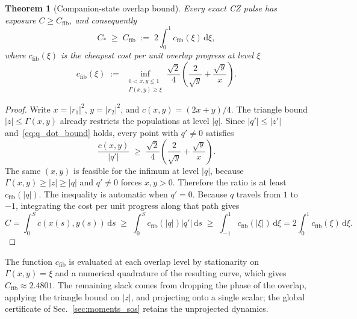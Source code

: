\documentclass[aps,prx,reprint,nofootinbib,longbibliography,floatfix]{revtex4-2}
\newtheorem{theorem}{Theorem}
\theoremstyle{plain}
\theoremstyle{remark}
\newcommand{\dd}{\mathrm{d}}
\begin{document}
\begin{theorem}[Companion-state overlap bound]
\label{thm:fiber}
Every exact CZ pulse has exposure $C\ge C_{\mathrm{fib}}$, and consequently
\begin{equation}
C_* \;\ge\; C_{\mathrm{fib}} \;:=\; 2\int_0^1 c_{\mathrm{fib}}(\xi)\,\dd\xi,
\label{eq:C_fib}
\end{equation}
where $c_{\mathrm{fib}}(\xi)$ is the cheapest cost per unit overlap progress at level $\xi$
\begin{equation}
c_{\mathrm{fib}}(\xi) \;:=\; \inf_{\substack{0 < x, y \le 1 \\ \Gamma(x,y) \ge \xi}} \frac{\sqrt{2}}{4}\left( \frac{2}{\sqrt{y}} + \frac{\sqrt{y}}{x} \right).
\label{eq:c_fib_def}
\end{equation}
\end{theorem}
\begin{proof}
Write $x=|r_1|^2$, $y=|r_2|^2$, and $c(x,y)=(2x+y)/4$. The triangle bound $|z|\le\Gamma(x,y)$ already restricts the populations at level $|q|$.
Since $|q'|\le|z'|$ and~\eqref{eq:q_dot_bound} holds, every point with $q'\ne0$ satisfies
\begin{equation}
\frac{c(x,y)}{|q'|}
\;\ge\; \frac{\sqrt{2}}{4}\left(\frac{2}{\sqrt{y}}+\frac{\sqrt{y}}{x}\right).
\label{eq:fiber_pointwise}
\end{equation}
The same $(x,y)$ is feasible for the infimum at level $|q|$, because $\Gamma(x,y)\ge|z|\ge|q|$ and $q'\ne0$ forces $x,y>0$. Therefore the ratio is at least $c_{\mathrm{fib}}(|q|)$.
The inequality is automatic when $q'=0$. Because $q$ travels from $1$ to $-1$, integrating the cost per unit progress along that path gives
\begin{equation}
C=\int_0^S c(x(s),y(s))\,\dd s
\;\ge\;\int_0^S c_{\mathrm{fib}}(|q|)|q'|\,\dd s
\;\ge\;\int_{-1}^{1}c_{\mathrm{fib}}(|\xi|)\,\dd\xi
=2\int_0^1c_{\mathrm{fib}}(\xi)\,\dd\xi.
\end{equation}
\end{proof}

The function $c_{\mathrm{fib}}$ is evaluated at each overlap level by stationarity on $\Gamma(x,y)=\xi$ and a numerical quadrature of the resulting curve, which gives $C_{\mathrm{fib}}\approx 2.4801$. The remaining slack comes from dropping the phase of the overlap, applying the triangle bound on $|z|$, and projecting onto a single scalar; the global certificate of Sec.~\ref{sec:moments_sos} retains the unprojected dynamics.

\end{document}
